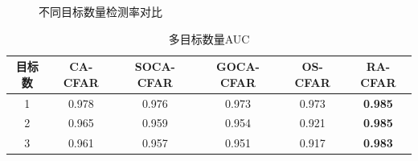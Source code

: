 \begin{figure}[htbp]
	\centering

	\caption{不同目标数量检测率对比}
	\label{fig:不同目标数量检测率对比}
\end{figure}
\begin{table}[htbp]
	\centering
	\tabcolsep=2mm
	\caption{多目标数量AUC}
	\begin{tabular}{cccccc}
		\toprule
		目标数 & CA-CFAR  & SOCA-CFAR & GOCA-CFAR&OS-CFAR& \textbf{RA-CFAR} \\
		\midrule
		1 & 0.978 & 0.976 & 0.973 & 0.973 & \textbf{0.985}\\
		2 & 0.965 & 0.959 & 0.954 & 0.921 & \textbf{0.985} \\
		3 & 0.961 & 0.957 & 0.951 & 0.917 & \textbf{0.983}\\
		\bottomrule
	\end{tabular}
	\label{多目标数量AUC}
\end{table}


